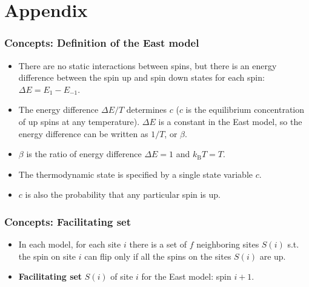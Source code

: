 \documentclass[8pt]{beamer}
\begin{document}
\section{Appendix}
\begin{frame}
	\frametitle{Concepts: Definition of the East model}
	\begin{itemize}
		\item There are no static interactions between spins, but there is an energy difference between the spin up and spin down states for each spin: $\Delta E= E_{1}- E_{-1}$.
		\item The energy difference $\Delta E/T$ determines $c$ ($c$ is the equilibrium concentration of up spins at any temperature). $\Delta E$ is a constant in the East model, so the energy difference can be written as $1/T$, or $\beta$. 
		\item $\beta$ is the ratio of energy difference $\Delta E=1$ and $k_\text{B}T=T$.
		\item The thermodynamic state is specified by a single state variable $c$.
		\item $c$ is also the probability that any particular spin is up.  
		
	\end{itemize}	
\end{frame}
\begin{frame}
	\frametitle{Concepts: Facilitating set}
	\begin{itemize}
		\item In each model, for each site $i$ there is a set of $f$ neighboring sites $S(i)$ s.t. the spin on site $i$ can flip only if all the spins on the sites $S(i)$ are up.
		\item \textbf{Facilitating set} $S(i)$ of site $i$ for the East model: spin $i+1$.
		
	\end{itemize}	
\end{frame}
\end{document}
